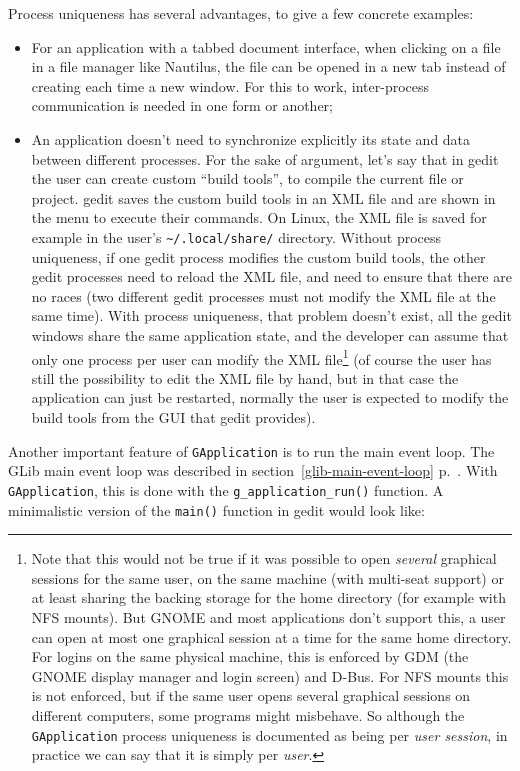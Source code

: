 Process uniqueness has several advantages, to give a few concrete examples:
\begin{itemize}
  \item For an application with a tabbed document interface, when clicking on a file in a file manager like Nautilus, the file can be opened in a new tab instead of creating each time a new window. For this to work, inter-process communication is needed in one form or another;
  \item An application doesn't need to synchronize explicitly its state and data between different processes. For the sake of argument, let's say that in gedit the user can create custom ``build tools'', to compile the current file or project. gedit saves the custom build tools in an XML file and are shown in the menu to execute their commands. On Linux, the XML file is saved for example in the user's \texttt{\textasciitilde{}/.local/share/} directory. Without process uniqueness, if one gedit process modifies the custom build tools, the other gedit processes need to reload the XML file, and need to ensure that there are no races (two different gedit processes must not modify the XML file at the same time). With process uniqueness, that problem doesn't exist, all the gedit windows share the same application state, and the developer can assume that only one process per user can modify the XML file\footnote{Note that this would not be true if it was possible to open \emph{several} graphical sessions for the same user, on the same machine (with multi-seat support) or at least sharing the backing storage for the home directory (for example with NFS mounts). But GNOME and most applications don't support this, a user can open at most one graphical session at a time for the same home directory. For logins on the same physical machine, this is enforced by GDM (the GNOME display manager and login screen) and D-Bus. For NFS mounts this is not enforced, but if the same user opens several graphical sessions on different computers, some programs might misbehave. So although the \lstinline{GApplication} process uniqueness is documented as being per \emph{user session}, in practice we can say that it is simply per \emph{user}.} (of course the user has still the possibility to edit the XML file by hand, but in that case the application can just be restarted, normally the user is expected to modify the build tools from the GUI that gedit provides).
\end{itemize}

Another important feature of \lstinline{GApplication} is to run the main event loop. The GLib main event loop was described in section~\ref{glib-main-event-loop} p.~\pageref{glib-main-event-loop}. With \lstinline{GApplication}, this is done with the \lstinline{g_application_run()} function. A minimalistic version of the \lstinline{main()} function in gedit would look like:

